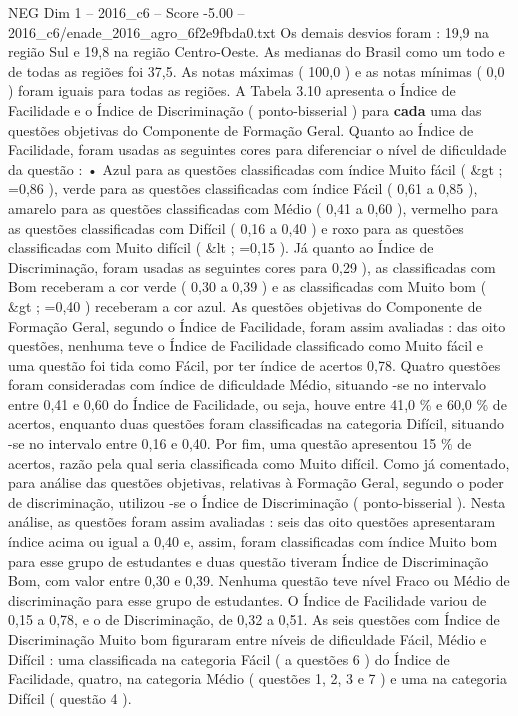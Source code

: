 \begin{textsample}{NEG Dim 1 – 2016\_c6 – Score -5.00 – 2016\_c6/enade\_2016\_agro\_6f2e9fbda0.txt}
Os demais desvios foram : 19,9 na região Sul e 19,8 na região Centro-Oeste.
As medianas do Brasil como um todo e de todas as regiões foi 37,5.
As notas máximas ( 100,0 ) e as notas mínimas ( 0,0 ) foram iguais para todas as regiões.
A Tabela 3.10 apresenta o Índice de Facilidade e o Índice de Discriminação ( ponto-bisserial ) para \textbf{cada} uma das questões objetivas do Componente de Formação Geral.
Quanto ao Índice de Facilidade, foram usadas as seguintes cores para diferenciar o nível de dificuldade da questão : • Azul para as questões classificadas com índice Muito fácil ( \&gt ; =0,86 ), verde para as questões classificadas com índice Fácil ( 0,61 a 0,85 ), amarelo para as questões classificadas com Médio ( 0,41 a 0,60 ), vermelho para as questões classificadas com Difícil ( 0,16 a 0,40 ) e roxo para as questões classificadas com Muito difícil ( \&lt ; =0,15 ).
Já quanto ao Índice de Discriminação, foram usadas as seguintes cores para 0,29 ), as classificadas com Bom receberam a cor verde ( 0,30 a 0,39 ) e as classificadas com Muito bom ( \&gt ; =0,40 ) receberam a cor azul.
As questões objetivas do Componente de Formação Geral, segundo o Índice de Facilidade, foram assim avaliadas : das oito questões, nenhuma teve o Índice de Facilidade classificado como Muito fácil e uma questão foi tida como Fácil, por ter índice de acertos 0,78.
Quatro questões foram consideradas com índice de dificuldade Médio, situando -se no intervalo entre 0,41 e 0,60 do Índice de Facilidade, ou seja, houve entre 41,0 \% e 60,0 \% de acertos, enquanto duas questões foram classificadas na categoria Difícil, situando -se no intervalo entre 0,16 e 0,40.
Por fim, uma questão apresentou 15 \% de acertos, razão pela qual seria classificada como Muito difícil.
Como já comentado, para análise das questões objetivas, relativas à Formação Geral, segundo o poder de discriminação, utilizou -se o Índice de Discriminação ( ponto-bisserial ).
Nesta análise, as questões foram assim avaliadas : seis das oito questões apresentaram índice acima ou igual a 0,40 e, assim, foram classificadas com índice Muito bom para esse grupo de estudantes e duas questão tiveram Índice de Discriminação Bom, com valor entre 0,30 e 0,39.
Nenhuma questão teve nível Fraco ou Médio de discriminação para esse grupo de estudantes.
O Índice de Facilidade variou de 0,15 a 0,78, e o de Discriminação, de 0,32 a 0,51.
As seis questões com Índice de Discriminação Muito bom figuraram entre níveis de dificuldade Fácil, Médio e Difícil : uma classificada na categoria Fácil ( a questões 6 ) do Índice de Facilidade, quatro, na categoria Médio ( questões 1, 2, 3 e 7 ) e uma na categoria Difícil ( questão 4 ).

\end{textsample}

